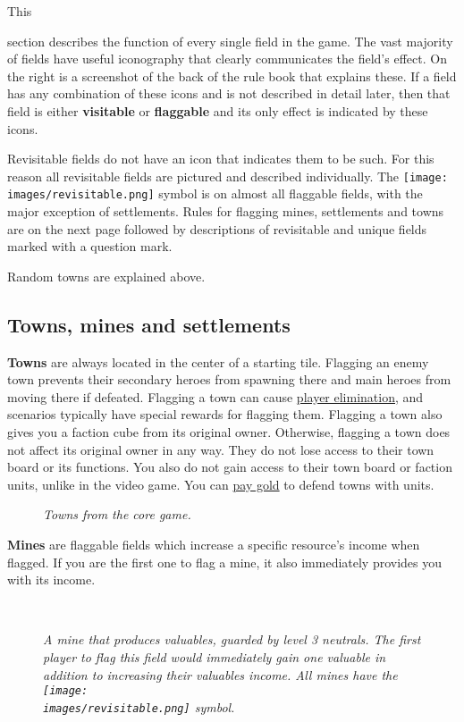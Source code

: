\hypertarget{All}{This} section describes the function of every single field in the game. The vast majority of fields have useful iconography that clearly communicates the field's effect. On the right is a screenshot of the back of the rule book that explains these. If a field has any combination of these icons and is not described in detail later, then that field is either \textbf{visitable} or \textbf{flaggable} and its only effect is indicated by these icons.\par
Revisitable fields do not have an icon that indicates them to be such. For this reason all revisitable fields are pictured and described individually. The \texttt{[image: \\images/revisitable.png]} symbol is on almost all flaggable fields, with the major exception of settlements. Rules for flagging mines, settlements and towns are on the next page followed by descriptions of revisitable and unique fields marked with a question mark.\par
Random towns are explained above.

\clearpage
\subsection*{Towns, mines and settlements}
\textbf{Towns} are always located in the center of a starting tile. Flagging an enemy town prevents their secondary heroes from spawning there and main heroes from moving there if defeated. Flagging a town can cause \hyperlink{End}{player elimination}, and scenarios typically have special rewards for flagging them. Flagging a town also gives you a faction cube from its original owner. Otherwise, flagging a town does not affect its original owner in any way. They do not lose access to their town board or its functions. You also do not gain access to their town board or faction units, unlike in the video game. You can \hyperlink{Town}{pay gold} to defend towns with units.\\
\begin{figure}[h]
\centering
{}
\caption{\textit{Towns from the core game.}}
\end{figure}

\textbf{Mines} are flaggable fields which increase a specific resource's income when flagged. If you are the first one to flag a mine, it also immediately provides you with its income.

\begin{figure}[h]
\centering
{}\\
\caption{\textit{A mine that produces valuables, guarded by level 3 neutrals. The first player to flag this field would immediately gain one valuable in addition to increasing their valuables income. All mines have the \texttt{[image: \\images/revisitable.png]} symbol.}}
\end{figure}


